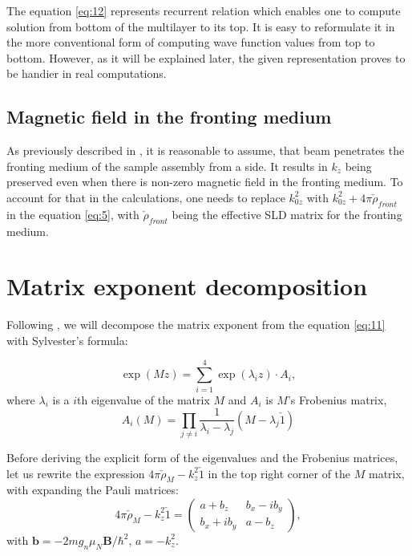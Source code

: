 \documentclass[12pt,a4paper]{article}
\begin{document}
The equation \ref{eq:12} represents recurrent relation which enables one to compute solution from bottom of the multilayer to its top. It is easy to reformulate it in the more conventional form of computing wave function values from top to bottom. However, as it will be explained later, the given representation proves to be handier in real computations.

\subsection{Magnetic field in the fronting medium}

As previously described in \cite{majkrzak}, it is reasonable to assume, that beam penetrates the fronting medium of the sample assembly from a side. It results in $k_z$ being preserved even when there is non-zero magnetic field in the fronting medium. To account for that in the calculations, one needs to replace $k_{0z}^2$ with $k_{0z}^2 + 4 \pi \check{\rho}_{front}$ in the equation \ref{eq:5}, with
$\check{\rho}_{front}$ being the effective SLD matrix for the fronting medium.

\section{Matrix exponent decomposition}

Following \cite{walter}, we will decompose the matrix exponent from the equation \ref{eq:11} with Sylvester's formula:

\begin{equation} \label{eq:13}
\exp{(M z)} = \sum_{i = 1}^{4} \exp{(\lambda_i z)} \cdot A_i,
\end{equation}
where $\lambda_i$ is a $i$th eigenvalue of the matrix $M$ and $A_i$ is $M$'s Frobenius matrix,
\begin{equation}
A_i(M) = \prod_{j \neq i} \frac{1}{\lambda_i - \lambda_j} (M - \lambda_j \check{1})
\end{equation}

Before deriving the explicit form of the eigenvalues and the Frobenius matrices, let us rewrite the expression $4 \pi \check{\rho}_M - k_z^2 \check{1}$ in the top right corner of the $M$ matrix, with expanding the Pauli matrices:
\begin{equation} \label{eq:15}
4 \pi \check{\rho}_M - k_z^2 \check{1}
=
\left(
\begin{matrix}
    a + b_z	&	b_x - i b_y \\
	b_x + i b_y	&	a - b_z
\end{matrix}
\right),
\end{equation}
with $\boldsymbol{b} = -2 m g_n \mu_N \boldsymbol{B}/ \hbar^2$, $a = -k_z^2$.
\end{document}
